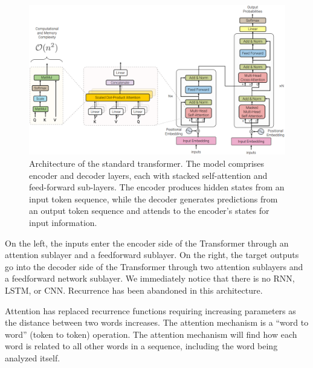 \documentclass{report}
\begin{document}
\begin{figure}[ht]
	\includegraphics[width=450pt]{58}
	\centering
	\caption{Architecture of the standard transformer. The model comprises encoder and decoder layers, each with stacked self-attention and feed-forward sub-layers. The encoder produces hidden states from an input token sequence, while the decoder generates predictions from an output token sequence and attends to the encoder’s states for input information.}
\end{figure}
 
On the left, the inputs enter the encoder side of the Transformer through an attention sublayer and a feedforward sublayer. On the right, the target outputs go into the decoder side of the Transformer through two attention sublayers and a feedforward network sublayer. We immediately notice that there is no RNN, LSTM, or CNN. Recurrence has been abandoned in this architecture.
 
Attention has replaced recurrence functions requiring increasing parameters as the distance between two words increases. The attention mechanism is a “word to word” (token to token) operation. The attention mechanism will find how each word is related to all other words in a sequence, including the word being analyzed itself.
\end{document}
